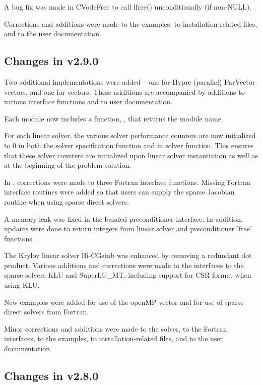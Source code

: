 A bug fix was made in CVodeFree to call lfree() unconditionally 
(if non-NULL).
 
Corrections and additions were made to the examples, 
to installation-related files,
and to the user documentation.


\subsection*{Changes in v2.9.0}

Two additional {\nvector} implementations were added -- one for
Hypre (parallel) ParVector vectors, and one for {\petsc} vectors.  These
additions are accompanied by additions to various interface functions
and to user documentation.

Each {\nvector} module now includes a function, ,
that returns the {\nvector} module name.

For each linear solver, the various solver performance counters are
now initialized to 0 in both the solver specification function and in
solver  function.  This ensures that these solver counters
are initialized upon linear solver instantiation as well as at the
beginning of the problem solution.

In {\fcvode}, corrections were made to three Fortran interface
functions.  Missing Fortran interface routines were added so that 
users can supply the sparse Jacobian routine when using sparse direct 
solvers.

A memory leak was fixed in the banded preconditioner interface.
In addition, updates were done to return integers from linear solver 
and preconditioner 'free' functions.

The Krylov linear solver Bi-CGstab was enhanced by removing a redundant
dot product.  Various additions and corrections were made to the
interfaces to the sparse solvers KLU and SuperLU\_MT, including support
for CSR format when using KLU.

New examples were added for use of the openMP vector and for use of 
sparse direct solvers from Fortran.

Minor corrections and additions were made to the {\cvode} solver, to the
Fortran interfaces, to the examples, to installation-related files,
and to the user documentation.

\subsection*{Changes in v2.8.0}


